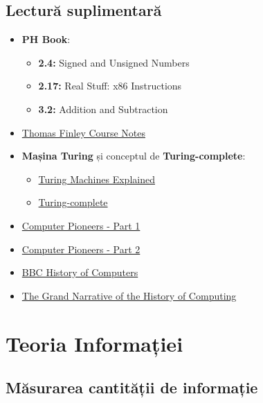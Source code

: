 \documentclass[a4paper,10pt]{article}
\begin{document}
\subsection{Lectură suplimentară}
\begin{itemize}
    \item \textbf{PH Book}:
        \begin{itemize}
            \item \textbf{2.4:} Signed and Unsigned Numbers
            \item \textbf{2.17:} Real Stuff: x86 Instructions
            \item \textbf{3.2:} Addition and Subtraction
        \end{itemize}
    \item \href{https://tfinley.net/csarch-notes/}{Thomas Finley Course Notes}
    \item \textbf{Mașina Turing} și conceptul de \textbf{Turing-complete}:
        \begin{itemize}
            \item \href{https://www.youtube.com/watch?v=dNRDvLACg5Q&pp=ygUZVHVyaW5nIE1hY2hpbmVzIGV4cGxhaW5lZA%3D%3D}{Turing Machines Explained}
            \item \href{https://www.youtube.com/watch?v=RPQD7-AOjMI&pp=ygUPdHVyaW5nIGNvbXBsZXRl}{Turing-complete}
        \end{itemize}
    \item \href{https://www.youtube.com/watch?v=qundvme1Tik&t=1816s&pp=ygUqY29tcHV0ZXIgcGlvbmVlcnMgcGlvbmVlciBjb21wdXRlcnMgcGFydCAy}{Computer Pioneers - Part 1}
    \item \href{https://www.youtube.com/watch?v=wsirYCAocZk&pp=ygUqY29tcHV0ZXIgcGlvbmVlcnMgcGlvbmVlciBjb21wdXRlcnMgcGFydCAy}{Computer Pioneers - Part 2}
    \item \href{https://www.youtube.com/watch?v=6dME3wgaQpM&list=PL1331A4548513EA81}{BBC History of Computers}
    \item \href{https://www.youtube.com/watch?v=njwQgz63rIs&pp=ygUvdGhlIGdyYW5kIG5hcnJhdGl2ZSBvZiB0aGUgaGlzdG9yeSBvZiBjb21wdXRpbmc%3D}{The Grand Narrative of the History of Computing}
\end{itemize}

\section{Teoria Informației}
\subsection{Măsurarea cantității de informație}
\end{document}
